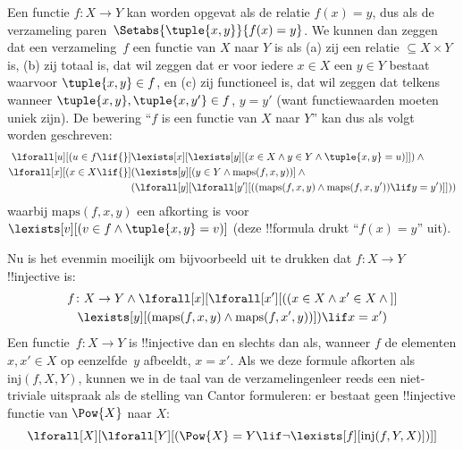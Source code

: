 \documentclass[openany]{memoir}
\begin{document}
Een functie $f \colon X \to Y$ kan worden opgevat als de relatie $f(x)
= y$, dus als de verzameling paren~$\Setabs{\tuple{x,y}}{f(x) = y}$.
We kunnen dan zeggen dat een verzameling~$f$ een functie van $X$ naar
$Y$ is als (a) zij een relatie $\subseteq X \times Y$ is, (b) zij
totaal is, dat wil zeggen dat er voor iedere $x \in X$ een $y \in Y$
bestaat waarvoor $\tuple{x, y} \in f$, en (c) zij functioneel is, dat
wil zeggen dat telkens wanneer $\tuple{x, y}, \tuple{x, y'} \in f$,
$y = y'$ (want functiewaarden moeten uniek zijn). De bewering ``$f$ is
een functie van $X$ naar $Y$'' kan dus als volgt worden geschreven:
\begin{align*}
 \lforall[u][(u \in f \lif {}] & \lexists[x][\lexists[y][(x \in X \land y \in
      Y \land \tuple{x, y} = u)]]) \land {}\\
 \lforall[x][(x \in X \lif {}] &
      (\lexists[y][(y \in Y \land \mathrm{maps}(f, x, y))] \land {}\\
& (\lforall[y][\lforall[y'][((\mathrm{maps}(f, x, y) \land
    \mathrm{maps}(f, x, y')) \lif y = y')]]))
\end{align*}
waarbij $\mathrm{maps}(f, x, y)$ een afkorting is voor
$\lexists[v][(v \in f \land \tuple{x, y} = v)]$ (deze !!{formula}
drukt ``$f(x) = y$'' uit).

Nu is het evenmin moeilijk om bijvoorbeeld uit te drukken dat
$f\colon X \to Y$ !!{injective} is:
\begin{multline*}
 f \colon X \to Y \land \lforall[x][\lforall[x'][((x \in X \land x' \in
     X \land {}]] \\
 \lexists[y][(\mathrm{maps}(f, x, y) \land \mathrm{maps}(f,
        x', y))]) \lif x = x')
\end{multline*}
Een functie~$f\colon X \to Y$ is !!{injective} dan en slechts dan als,
wanneer $f$ de elementen $x, x' \in X$ op eenzelfde~$y$ afbeeldt,
$x = x'$. Als we deze formule afkorten als $\mathrm{inj}(f, X, Y)$,
kunnen we in de taal van de verzamelingenleer reeds een niet-triviale
uitspraak als de stelling van Cantor formuleren: er bestaat geen
!!{injective} functie van $\Pow{X}$ naar $X$:
\[
\lforall[X][\lforall[Y][(\Pow{X} = Y \lif
    \lnot\lexists[f][\mathrm{inj}(f, Y, X)])]]
\]
\end{document}
